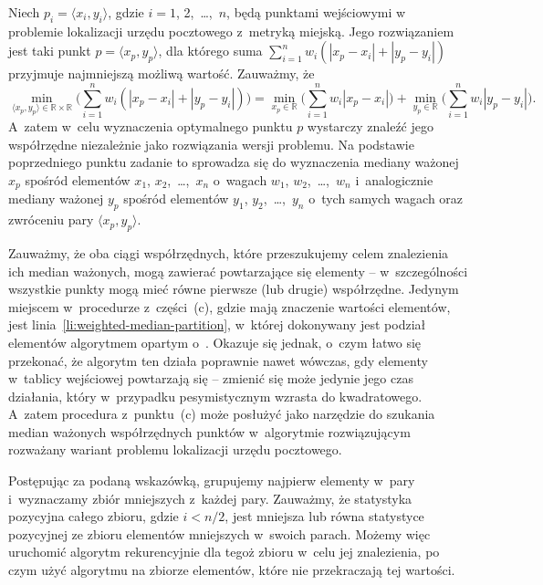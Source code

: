 \subproblem %
Niech $p_i=\langle x_i,y_i\rangle$, gdzie $i=1$, 2,~\dots,~$n$, będą punktami wejściowymi w~ problemie lokalizacji urzędu pocztowego z~metryką miejską. Jego rozwiązaniem jest taki punkt $p=\langle x_p,y_p\rangle$, dla którego suma $\sum_{i=1}^nw_i(|x_p-x_i|+|y_p-y_i|)$ przyjmuje najmniejszą możliwą wartość. Zauważmy, że
\[
    \min_{\langle x_p,y_p\rangle\in\mathbb{R}\times\mathbb{R}}\biggl(\sum_{i=1}^nw_i(|x_p-x_i|+|y_p-y_i|)\biggr) = \min_{x_p\in\mathbb{R}}\biggl(\sum_{i=1}^nw_i|x_p-x_i|\biggr)+\min_{y_p\in\mathbb{R}}\biggl(\sum_{i=1}^nw_i|y_p-y_i|\biggr).
\]
A~zatem w~celu wyznaczenia optymalnego punktu $p$ wystarczy znaleźć jego współrzędne niezależnie jako rozwiązania  wersji problemu. Na podstawie poprzedniego punktu zadanie to sprowadza się do wyznaczenia mediany ważonej $x_p$ spośród elementów $x_1$, $x_2$,~\dots,~$x_n$ o~wagach $w_1$, $w_2$,~\dots,~$w_n$ i~analogicznie mediany ważonej $y_p$ spośród elementów $y_1$, $y_2$,~\dots,~$y_n$ o~tych samych wagach oraz zwróceniu pary $\langle x_p,y_p\rangle$.

Zauważmy, że oba ciągi współrzędnych, które przeszukujemy celem znalezienia ich median ważonych, mogą zawierać powtarzające się elementy -- w~szczególności wszystkie punkty mogą mieć równe pierwsze (lub drugie) współrzędne. Jedynym miejscem w~procedurze  z~części~(c), gdzie mają znaczenie wartości elementów, jest linia~\ref{li:weighted-median-partition}, w~której dokonywany jest podział elementów algorytmem opartym o~. Okazuje się jednak, o~czym łatwo się przekonać, że algorytm ten działa poprawnie nawet wówczas, gdy elementy w~tablicy wejściowej powtarzają się -- zmienić się może jedynie jego czas działania, który w~przypadku pesymistycznym wzrasta do kwadratowego. A~zatem procedura z~punktu~(c) może posłużyć jako narzędzie do szukania median ważonych współrzędnych punktów w~algorytmie rozwiązującym rozważany wariant problemu lokalizacji urzędu pocztowego.


\subproblem %

\noindent Postępując za podaną wskazówką, grupujemy najpierw elementy w~pary i~wyznaczamy zbiór mniejszych z~każdej pary. Zauważmy, że  statystyka pozycyjna całego zbioru, gdzie $i<n/2$, jest mniejsza lub równa  statystyce pozycyjnej ze zbioru elementów mniejszych w~swoich parach. Możemy więc uruchomić algorytm rekurencyjnie dla tegoż zbioru w~celu jej znalezienia, po czym użyć algorytmu  na zbiorze elementów, które nie przekraczają tej wartości.

